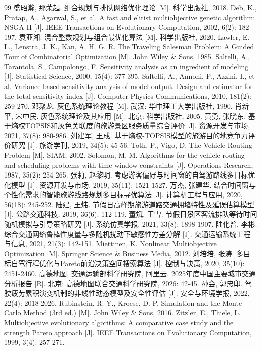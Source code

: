 \documentclass{cumcmthesis}
\begin{document}
\begin{thebibliography}{99}
\small
\setlength{\itemsep}{0pt}
 盛昭瀚, 那荣起. 组合规划与排队网络优化理论 [M]. 科学出版社, 2018.
 Deb, K., Pratap, A., Agarwal, S., et al. A fast and elitist multiobjective genetic algorithm: NSGA-II [J]. IEEE Transactions on Evolutionary Computation, 2002, 6(2): 182-197.
 袁亚湘. 混合整数规划与组合最优化算法 [M]. 科学出版社, 2020.
 Lawler, E. L., Lenstra, J. K., Kan, A. H. G. R. The Traveling Salesman Problem: A Guided Tour of Combinatorial Optimization [M]. John Wiley \& Sons, 1985.
 Saltelli, A., Tarantola, S., Campolongo, F. Sensitivity analysis as an ingredient of modeling [J]. Statistical Science, 2000, 15(4): 377-395.
 Saltelli, A., Annoni, P., Azzini, I., et al. Variance based sensitivity analysis of model output. Design and estimator for the total sensitivity index [J]. Computer Physics Communications, 2010, 181(2): 259-270.
 邓聚龙. 灰色系统理论教程 [M]. 武汉: 华中理工大学出版社, 1990.
 肖新平, 宋中民. 灰色系统理论及其应用 [M]. 北京: 科学出版社, 2005.
 黄勇, 张晓东. 基于熵权TOPSIS和灰色关联度的旅游景区服务质量综合评价 [J]. 资源开发与市场, 2021, 37(8): 980-986.
 刘建军, 王成. 基于熵权-TOPSIS模型的旅游目的地竞争力评价研究 [J]. 旅游学刊, 2019, 34(5): 45-56.
 Toth, P., Vigo, D. The Vehicle Routing Problem [M]. SIAM, 2002.
 Solomon, M. M. Algorithms for the vehicle routing and scheduling problems with time window constraints [J]. Operations Research, 1987, 35(2): 254-265.
 张莉, 赵黎明. 考虑游客偏好与时间窗的自驾游路线多目标优化模型 [J]. 资源开发与市场, 2019, 35(11): 1521-1527.
 万杰, 张建华. 结合时间窗与个性化需求的智能旅游线路规划多目标寻优算法 [J]. 计算机工程与应用, 2020, 56(18): 245-252.
 陆建, 王炜. 节假日高峰期旅游道路交通拥堵特性及延误估算模型 [J]. 公路交通科技, 2019, 36(6): 112-119.
 董斌, 王雪. 节假日景区客流排队等待时间随机模拟与引导策略研究 [J]. 系统仿真学报, 2021, 33(8): 1898-1907.
 陆化普, 李彬. 综合交通网络鲁棒性度量与多随机扰动下敏感性方差分解 [J]. 交通运输系统工程与信息, 2021, 21(3): 142-151.
 Miettinen, K. Nonlinear Multiobjective Optimization [M]. Springer Science \& Business Media, 2012.
 刘培培, 张涛. 多目标自驾行程优化与Pareto前沿决策空间搜索算法 [J]. 控制与决策, 2020, 35(10): 2451-2460.
 高德地图, 交通运输部科学研究院, 阿里云. 2025年度中国主要城市交通分析报告 [R]. 北京: 高德地图联合交通科学研究院, 2026: 42-45.
 孙会, 郭忠印. 驾驶疲劳累积演变机制的非线性动态模型及安全性评估 [J]. 安全与环境学报, 2022, 22(4): 2018-2026.
 Rubinstein, R. Y., Kroese, D. P. Simulation and the Monte Carlo Method (3rd ed.) [M]. John Wiley \& Sons, 2016.
 Zitzler, E., Thiele, L. Multiobjective evolutionary algorithms: A comparative case study and the strength Pareto approach [J]. IEEE Transactions on Evolutionary Computation, 1999, 3(4): 257-271.
\end{thebibliography}
\end{document}
